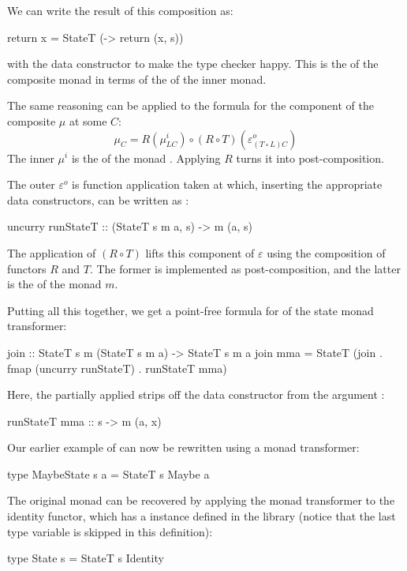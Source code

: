 \documentclass[DaoFP]{subfiles}
\begin{document}
We can write the result of this composition as:
\begin{haskell}
return x = StateT (\s -> return (x, s))
\end{haskell}
with the data constructor  to make the type checker happy. This is the  of the composite monad in terms of the  of the inner monad.

The same reasoning can be applied to the formula for the component of the composite $\mu$ at some $C$: 
\[ \mu_C = R(\mu^i_{L C}) \circ (R \circ T) (\varepsilon^o_{(T\circ L)C})\]
The inner $\mu^i$ is the  of the monad . Applying $R$ turns it into post-composition. 

The outer $\varepsilon^o$ is function application taken at  which, inserting the appropriate data constructors, can be written as :
\begin{haskell}
uncurry runStateT :: (StateT s m a, s) -> m (a, s)
\end{haskell}
The application of $(R \circ T)$ lifts this component of $\varepsilon$ using the composition of functors $R$ and $T$. The former is implemented as  post-composition, and the latter is the  of the monad $m$. 

Putting all this together, we get a point-free formula for  of the state monad transformer:
\begin{haskell}
join :: StateT s m (StateT s m a) -> StateT s m a
join mma = StateT (join . fmap (uncurry runStateT) . runStateT mma)
\end{haskell}
Here, the partially applied  strips off the data constructor from the argument :
\begin{haskell}
runStateT mma :: s -> m (a, x)
\end{haskell}

Our earlier example of  can now be rewritten using a monad transformer:
\begin{haskell}
type MaybeState s a = StateT s Maybe a
\end{haskell}

The original  monad can be recovered by applying the  monad transformer to the identity functor, which has a  instance defined in the library (notice that the last type variable  is skipped in this definition):
\begin{haskell}
type State s = StateT s Identity
\end{haskell}
\end{document}

